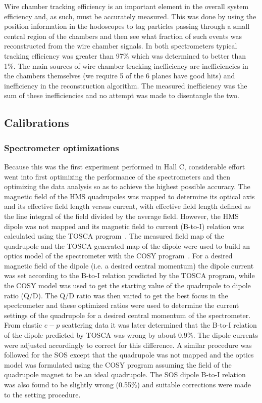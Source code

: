 \documentclass[aps,prl,twocolumn,showpacs,amsmath,amssymb,floats]{revtex4}
\begin{document}
Wire chamber tracking efficiency is an important element in the overall system 
efficiency and, as such, must be accurately measured.  This was done by using 
the position information in the hodoscopes to tag particles passing through a 
small central region of the chambers and then see what fraction of such events 
was reconstructed from the wire chamber signals.  In both spectrometers 
typical tracking efficiency was greater than 97\% which was determined to 
better than 1\%.  The main sources of wire chamber tracking inefficiency are 
inefficiencies in the chambers themselves (we require 5 of the 6 planes have good hits) and inefficiency in the reconstruction algorithm. The measured 
inefficiency was the sum of these inefficiencies and no attempt was 
made to disentangle the two.

\subsection*{Calibrations}

\subsubsection*{Spectrometer optimizations}

Because this was the first experiment performed in Hall C, considerable effort 
went into first optimizing the performance of the spectrometers and then optimizing the data analysis so as to achieve the highest possible accuracy.  The magnetic field of the HMS quadrupoles was mapped to determine its optical axis and its effective field length versus current, with effective field length defined as the line integral of the field divided by the average field. However, the HMS 
dipole was not mapped and its magnetic field to current (B-to-I) relation was 
calculated using the TOSCA program~\cite{tosca}. The measured field map 
of the quadrupole and the TOSCA generated map of the dipole were used to build an optics model of the spectrometer with the COSY program~\cite{cosy1}. For a 
desired magnetic field of the dipole (i.e. a desired central momentum) the dipole current was set according to the B-to-I relation predicted by the TOSCA program, while the COSY model was used to get the starting value of the quadrupole to dipole ratio (Q/D). The Q/D ratio was then varied to get the best focus in the 
spectrometer and these optimized ratios were used to determine the 
current settings of the quadrupole for a desired central momentum of the 
spectrometer. From elastic $e-p$ scattering data it was later determined that 
the B-to-I relation of the dipole predicted by TOSCA was wrong by about 0.9\%. 
The dipole currents were adjusted accordingly to correct for this difference.  
A similar procedure was followed for the SOS except that the quadrupole was 
not mapped and the optics model was formulated using the COSY program assuming 
the field of the quadrupole magnet to be an ideal quadrupole.  The SOS 
dipole B-to-I relation was also found to be slightly wrong (0.55\%) and suitable corrections were made to the setting procedure.
\end{document}
